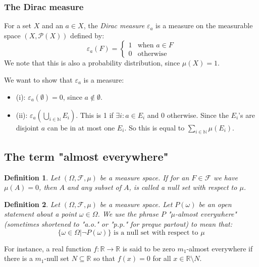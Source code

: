 \documentclass[12pt, a4paper]{article}
\newtheorem{definition}{Definition}[section]
\numberwithin{equation}{section}
\begin{document}
\subsubsection{The Dirac measure}
For a set $X$ and an $a\in X$, the \textit{Dirac measure} $\varepsilon_a$ is a measure on the measurable space $(X,\mathcal{P}(X))$ defined by:
\begin{equation}
\varepsilon_a(F)=
\begin{cases}
1	& \textrm{when }a\in F \\
0	& \textrm{otherwise}
\end{cases}
\end{equation}
We note that this is also a probability distribution, since $\mu(X)=1$.

We want to show that $\varepsilon_a$ is a measure:
\begin{itemize}
\item (i): $\varepsilon_a(\emptyset)=0$, since $a\notin\emptyset$.
\item (ii): $\varepsilon_a\left(\bigcup_{i\in\mathbb{N}} E_i\right)$. This is 1 if $\exists i: a\in E_i$ and 0 otherwise. Since the $E_i$'s are disjoint $a$ can be in at most one $E_i$. So this is equal to $\sum_{i\in\mathbb{N}}\mu(E_i)$.
\end{itemize}

\subsection{The term "almost everywhere"}
\begin{definition}
Let $(\Omega,\mathcal{F},\mu)$ be a measure space. If for an $F\in\mathcal{F}$ we have $\mu(A)=0$, then $A$ and any subset of $A$, is called a null set with respect to $\mu$.
\end{definition}

\begin{definition}
Let $(\Omega,\mathcal{F},\mu)$ be a measure space. Let $P(\omega)$ be an open statement about a point $\omega\in\Omega$. We use the phrase $P$ "$\mu$-almost everywhere" (sometimes shortened to "a.o." or "p.p." for preque partout) to mean that:
\begin{equation}
\{\omega\in\Omega|\neg P(\omega)\}\textrm{ is a null set with respect to }\mu
\end{equation}
\end{definition}

For instance, a real function $f: \mathbb{R}\rightarrow\mathbb{R}$ is said to be zero $m_1$-almost everywhere if there is a $m_1$-null set $N\subseteq\mathbb{R}$ so that $f(x)=0$ for all $x\in\mathbb{R}\setminus N$.
\end{document}
